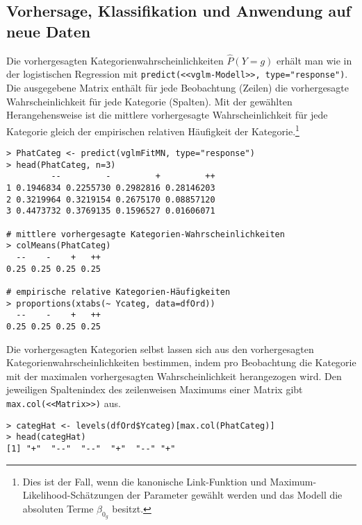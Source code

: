 \subsection{Vorhersage, Klassifikation und Anwendung auf neue Daten}

Die vorhergesagten Kategorienwahrscheinlichkeiten $\hat{P}(Y = g)$ erhält man wie in der logistischen Regression mit \lstinline!predict(<<vglm-Modell>>, type="response")!. Die ausgegebene Matrix enthält für jede Beobachtung (Zeilen) die vorhergesagte Wahrscheinlichkeit für jede Kategorie (Spalten). Mit der gewählten Herangehensweise ist die mittlere vorhergesagte Wahrscheinlichkeit für jede Kategorie gleich der empirischen relativen Häufigkeit der Kategorie.\footnote{Dies ist der Fall, wenn die kanonische Link-Funktion und Maximum-Likelihood-Schätzungen der Parameter gewählt werden und das Modell die absoluten Terme $\beta_{0_{g}}$ besitzt.}
\begin{lstlisting}
> PhatCateg <- predict(vglmFitMN, type="response")
> head(PhatCateg, n=3)
         --         -         +         ++
1 0.1946834 0.2255730 0.2982816 0.28146203
2 0.3219964 0.3219154 0.2675170 0.08857120
3 0.4473732 0.3769135 0.1596527 0.01606071

# mittlere vorhergesagte Kategorien-Wahrscheinlichkeiten
> colMeans(PhatCateg)
  --    -    +   ++
0.25 0.25 0.25 0.25

# empirische relative Kategorien-Häufigkeiten
> proportions(xtabs(~ Ycateg, data=dfOrd))
  --    -    +   ++
0.25 0.25 0.25 0.25
\end{lstlisting}

Die vorhergesagten Kategorien selbst lassen sich aus den vorhergesagten Kategorienwahrscheinlichkeiten bestimmen, indem pro Beobachtung die Kategorie mit der maximalen vorhergesagten Wahrscheinlichkeit herangezogen wird. Den jeweiligen Spaltenindex des zeilenweisen Maximums einer Matrix gibt \lstinline!max.col(<<Matrix>>)! aus.
\begin{lstlisting}
> categHat <- levels(dfOrd$Ycateg)[max.col(PhatCateg)]
> head(categHat)
[1] "+"  "--"  "--"  "+"  "--" "+"
\end{lstlisting}

